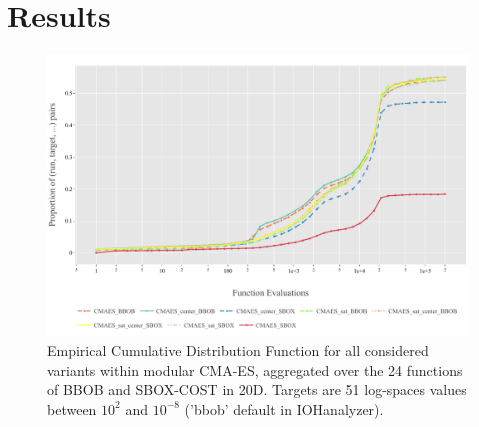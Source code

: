 \documentclass[sigconf=true, nonacm=false, review=true, anonymous = false,screen=true]{acmart}
\begin{document}
\section{Results}
\begin{figure}[!tb]
 \centering
 \includegraphics[width=.95\linewidth,trim=1mm 5mm 13mm 9mm,clip]{Figures/ECDF_20D_CMAESS.pdf}
 \caption{Empirical Cumulative Distribution Function for all considered variants within modular CMA-ES, aggregated over the 24 functions of BBOB and SBOX-COST in 20D. Targets are 51 log-spaces values between $10^2$ and $10^{-8}$ ('bbob' default in IOHanalyzer).}\label{fig:res_ecdf2}
\end{figure}
\end{document}
